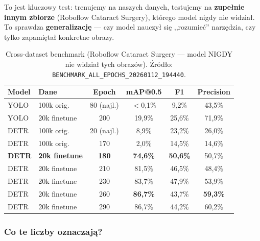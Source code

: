 To jest kluczowy test: trenujemy na naszych danych, testujemy na
\textbf{zupełnie innym zbiorze} (Roboflow Cataract Surgery), którego model
nigdy nie widział.  To sprawdza \textbf{generalizację} --- czy model nauczył
się ,,rozumieć'' narzędzia, czy tylko zapamiętał konkretne obrazy.

\begin{table}[h]
\centering
\caption{Cross-dataset benchmark (Roboflow Cataract Surgery --- model
         NIGDY nie widział tych obrazów).  Źródło:
         \texttt{BENCHMARK\_ALL\_EPOCHS\_20260112\_194440}.}
\label{tab:bench_cross}
\begin{tabular}{llcccc}
\toprule
\textbf{Model} & \textbf{Dane} & \textbf{Epoch} & \textbf{mAP@0.5} &
    \textbf{F1} & \textbf{Precision} \\
\midrule
YOLO & 100k orig.   & 80 (najl.)  & $<$0{,}1\% & 9{,}2\% & 43{,}5\% \\
YOLO & 20k finetune & 200         & 19{,}9\%   & 25{,}6\% & 71{,}9\% \\
\midrule
DETR & 100k orig.   & 20 (najl.)  & 8{,}9\%    & 23{,}2\% & 26{,}0\% \\
DETR & 100k orig.   & 170         & 2{,}0\%    & 14{,}5\% & 14{,}6\% \\
\midrule
\textbf{DETR} & \textbf{20k finetune} & \textbf{180} &
    \textbf{74{,}6\%} & \textbf{50{,}6\%} & 50{,}7\% \\
DETR & 20k finetune & 210 & 81{,}5\% & 46{,}5\% & 48{,}4\% \\
DETR & 20k finetune & 230 & 83{,}7\% & 47{,}9\% & 53{,}9\% \\
DETR & 20k finetune & 260 & \textbf{86{,}7\%} & 43{,}7\% & \textbf{59{,}3\%} \\
DETR & 20k finetune & 290 & 86{,}7\% & 44{,}2\% & 60{,}2\% \\
\bottomrule
\end{tabular}
\end{table}

\subsubsection{Co te liczby oznaczają?}

